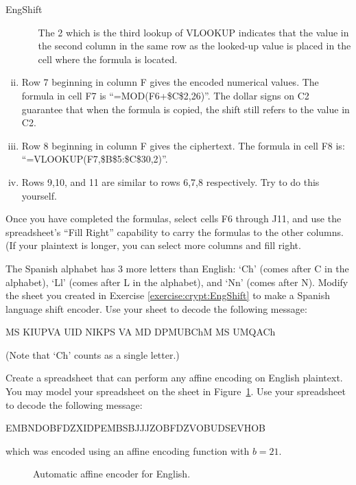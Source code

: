\begin{exercise}{EngShift}
\begin{enumerate}[(i)]
\begin{itemize}
The 2 which is the third lookup of VLOOKUP indicates that the value in the second column in the same row as the looked-up value is placed in the cell where the formula is located.
\end{itemize}
\item
Row 7 beginning in column F gives the encoded numerical values. The formula in cell F7 is ``=MOD(F6+\$C\$2,26)''.  The dollar signs on C2 guarantee that when the formula is copied, the shift still refers to the value in C2.
\item
Row 8 beginning in column F gives the ciphertext.  The formula in cell F8 is: ``=VLOOKUP(F7,\$B\$5:\$C\$30,2)''. 
\item
Rows 9,10, and 11 are similar to rows 6,7,8 respectively. Try to do this yourself. 
\end{enumerate}
Once you have completed the formulas, select cells F6 through J11, and use the spreadsheet's ``Fill Right'' capability to carry the formulas to the other columns.  (If your plaintext is longer, you can select more columns and fill right.
\end{exercise}

\begin{exercise}{}
The Spanish alphabet has 3 more letters than English:  `Ch' (comes after C in the alphabet), `Ll'  (comes after L in the alphabet), and `Nn' (comes after N).  Modify the sheet you created in Exercise \ref{exercise:crypt:EngShift} to make a Spanish language shift encoder.  Use your sheet to decode the following message:

MS KIUPVA	UID NIKPS VA MD DPMUBChM MS UMQACh

(Note that `Ch' counts as a single letter.)
\end{exercise}

\begin{exercise}{}
Create a spreadsheet that can perform any affine encoding on English plaintext.  You may model your spreadsheet on the sheet in Figure~\ref{fig:affine}.  Use your spreadsheet to decode the following message:


EMBNDOBFDZXIDPEMBSBJJJZOBFDZVOBUDSEVHOB

which was encoded using an affine encoding function with $b=21$.
\begin{figure}[h]
\caption{Automatic affine encoder for English.}
\label{fig:affine}
\end{figure}
\end{exercise}

